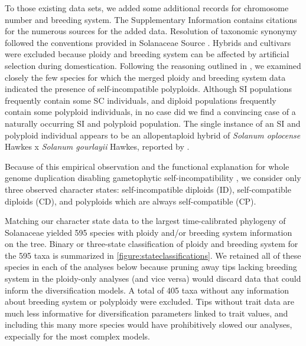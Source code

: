 To those existing data sets, we added some additional records for chromosome number and breeding system.
The Supplementary Information contains citations for the numerous sources for the added data. %
Resolution of taxonomic synonymy followed the conventions provided in Solanaceae Source \citep{solsource}. %
Hybrids and cultivars were excluded because ploidy and breeding system can be affected by artificial selection during domestication. %
Following the reasoning outlined in \citet{robertson_2011}, we examined closely the few species for which the merged ploidy and breeding system data indicated the presence of self-incompatible polyploids.
Although SI populations frequently contain some SC individuals, and diploid populations frequently contain some polyploid individuals, in no case did we find a convincing case of a naturally occurring SI and polyploid population.
The single instance of an SI and polyploid individual appears to be an allopentaploid hybrid of {\em Solanum oplocense} Hawkes x {\em Solanum gourlayii} Hawkes, reported by \citealt{camadro1981}.

Because of this empirical observation and the functional explanation for whole genome duplication disabling gametophytic self-incompatibility \citep[reviewed in][]{ramsey_1998,stone_2002}, we consider only three observed character states: self-incompatible diploids (ID), self-compatible diploids (CD), and polyploids which are always self-compatible (CP).


Matching our character state data to the largest time-calibrated phylogeny of Solanaceae \citep{sarkinen_2013} yielded 595 species with ploidy and/or breeding system information on the tree.
Binary or three-state classification of ploidy and breeding system for the 595 taxa is summarized in \cref{figure:stateclassifications}.
We retained all of these species in each of the analyses below because pruning away tips lacking breeding system in the ploidy-only analyses (and vice versa) would discard data that could inform the diversification models.
A total of 405 taxa without any information about breeding system or polyploidy were excluded.
Tips without trait data are much less informative for diversification parameters linked to trait values, and including this many more species would have prohibitively slowed our analyses, expecially for the most complex models.

